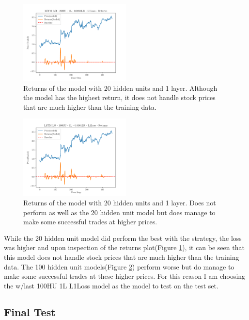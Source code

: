 \begin{figure}[h]
    \centering
    \includegraphics[width=0.5\textwidth, trim=20 0 20 10, clip]{plots/LSTM AO - 20HU - 1L - 0.0001LR - L1Loss-returns.pdf}
    \caption{Returns of the model with 20 hidden units and 1 layer. Although the model has the highest return, it does not handle stock prices that are much higher than the training data.}
    \label{fig:20HU_1L_returns}
\end{figure}

\begin{figure}[h]
    \centering
    \includegraphics[width=0.5\textwidth, trim=20 0 20 10, clip]{plots/LSTM LO - 100HU - 1L - 0.0001LR - L1Loss-returns.pdf}
    \caption{Returns of the model with 20 hidden units and 1 layer. Does not perform as well as the 20 hidden unit model but does manage to make some successful trades at higher prices.}
    \label{fig:100HU_1L_returns}
\end{figure}

While the 20 hidden unit model did perform the best with the strategy, the loss was higher and upon inspection of the returns plot(Figure \ref{fig:20HU_1L_returns}), it can be seen that this model does not handle stock prices that are much higher than the training data. The 100 hidden unit models(Figure \ref{fig:100HU_1L_returns}) perform worse but do manage to make some successful trades at these higher prices. For this reason I am choosing the w/last 100HU 1L L1Loss model as the model to test on the test set.

\subsection{Final Test}


